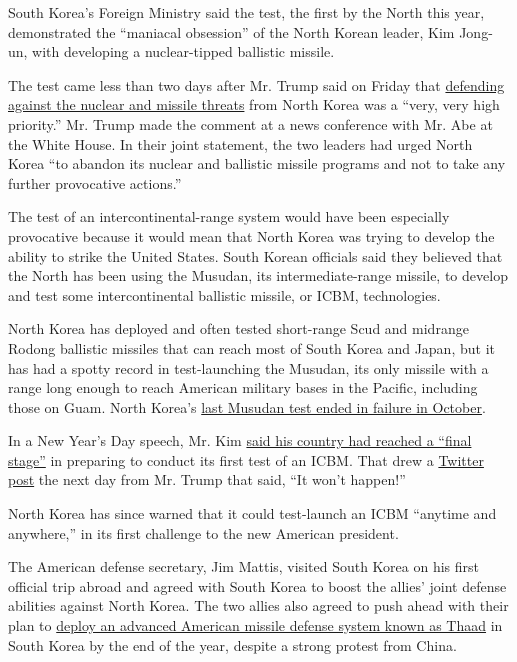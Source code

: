 South Korea's Foreign Ministry said the test, the first by the North
this year, demonstrated the ``maniacal obsession'' of the North Korean
leader, Kim Jong-un, with developing a nuclear-tipped ballistic missile.

The test came less than two days after Mr. Trump said on Friday that
\href{https://www.nytimes3xbfgragh.onion/reuters/2017/02/10/world/asia/10reuters-usa-trump-japan.html}{defending
against the nuclear and missile threats} from North Korea was a ``very,
very high priority.'' Mr. Trump made the comment at a news conference
with Mr. Abe at the White House. In their joint statement, the two
leaders had urged North Korea ``to abandon its nuclear and ballistic
missile programs and not to take any further provocative actions.''

The test of an intercontinental-range system would have been especially
provocative because it would mean that North Korea was trying to develop
the ability to strike the United States. South Korean officials said
they believed that the North has been using the Musudan, its
intermediate-range missile, to develop and test some intercontinental
ballistic missile, or ICBM, technologies.

North Korea has deployed and often tested short-range Scud and midrange
Rodong ballistic missiles that can reach most of South Korea and Japan,
but it has had a spotty record in test-launching the Musudan, its only
missile with a range long enough to reach American military bases in the
Pacific, including those on Guam. North Korea's
\href{https://www.nytimes3xbfgragh.onion/2016/10/20/world/asia/north-korea-musudan-missile-failure.html}{last
Musudan test ended in failure in October}.

In a New Year's Day speech, Mr. Kim
\href{https://www.nytimes3xbfgragh.onion/2017/01/01/world/asia/north-korea-intercontinental-ballistic-missile-test-kim-jong-un.html}{said
his country had reached a ``final stage''} in preparing to conduct its
first test of an ICBM. That drew a
\href{https://twitter.com/realdonaldtrump/status/816057920223846400?lang=en}{Twitter
post} the next day from Mr. Trump that said, ``It won't happen!''

North Korea has since warned that it could test-launch an ICBM ``anytime
and anywhere,'' in its first challenge to the new American president.

The American defense secretary, Jim Mattis, visited South Korea on his
first official trip abroad and agreed with South Korea to boost the
allies' joint defense abilities against North Korea. The two allies also
agreed to push ahead with their plan to
\href{https://www.nytimes3xbfgragh.onion/2017/02/02/world/asia/james-mattis-us-korea-thaad.html}{deploy
an advanced American missile defense system known as Thaad} in South
Korea by the end of the year, despite a strong protest from China.

